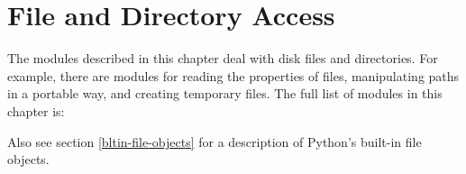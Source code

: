 \chapter{File and Directory Access}
\label{filesys}

The modules described in this chapter deal with disk files and
directories.  For example, there are modules for reading the
properties of files, manipulating paths in a portable way, and
creating temporary files.  The full list of modules in this chapter is:

\localmoduletable

Also see section \ref{bltin-file-objects} for a description 
of Python's built-in file objects.

\begin{seealso}
\end{seealso}
